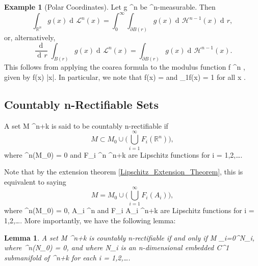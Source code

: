 \documentclass[a4paper, 11pt]{article}
\theoremstyle{plain}
\newtheorem{lemma}[theorem]{Lemma}
\theoremstyle{definition}
\newtheorem{example}[theorem]{Example}
\theoremstyle{remark}
\DeclareMathOperator{\diff}{d \!}
\numberwithin{equation}{subsection}
\def\({}
\def\){}
\begin{document}
\begin{example}[Polar Coordinates]
\label{Polar_Coordinates}
Let \(g \vcentcolon {}^{n} \rightarrow {}\) be \(^{n}\)-measurable. Then
\begin{equation}
\int_{\mathbb{R}^{n}}g(x)\diff \mathcal{L}^{n}(x) = \int_{0}^{\infty}\int_{\partial B(r)}g(x)\diff\mathcal{H}^{n-1}(x)\diff r,
\end{equation}
or, alternatively,
\begin{equation}
\frac{\!\diff}{\diff r}\int_{B(r)}g(x)\diff \mathcal{L}^{n}(x) = \int_{\partial B(r)}g(x)\diff\mathcal{H}^{n-1}(x).
\end{equation}
This follows from applying the coarea formula to the modulus function \(f \vcentcolon {}^{n} \rightarrow {}\), given by \(f(x) \coloneq |x|\). In particular, we note that \(\nabla f(x) = \) and \(_{1}f(x) = 1\) for all \(x \).
\end{example}

\subsection{Countably \(n\)-Rectifiable Sets}

A set \(M \subset {}^{n+k}\) is said to be countably \(n\)-rectifiable if
\begin{equation}
M \subset M_0 \cup \bigg(\bigcup_{i=1}^{\infty}F_i(\mathbb{R}^n)\bigg),
\end{equation}
where \(^{n}(M_0) = 0\) and \(F_i \vcentcolon {}^{n} \rightarrow {}^{n+k}\) are Lipschitz functions for \(i = 1,2,\ldots\).

Note that by the extension theorem \ref{Lipschitz_Extension_Theorem}, this is equivalent to saying
\begin{equation}
M = M_0 \cup \bigg(\bigcup_{i=1}^{\infty}F_i(A_i)\bigg),
\end{equation}
where \(^{n}(M_0) = 0\), \(A_i \subset {}^{n}\) and \(F_i \vcentcolon A_i \rightarrow {}^{n+k}\) are Lipschitz functions for \(i = 1,2,\ldots\). More importantly, we have the following lemma:

\begin{lemma}
\label{Rectifiable_iff_submanifoldCover}
A set \(M \subset {}^{n+k}\) is countably \(n\)-rectifiable if and only if \(M \subset \bigcup_{i=0}^{\infty}N_i\), where \(^{n}(N_0) = 0\), and where \(N_i\) is an \(n\)-dimensional embedded \(C^1\) submanifold of \(^{n+k}\) for each \(i = 1,2,\ldots\).
\end{lemma}
\end{document}
